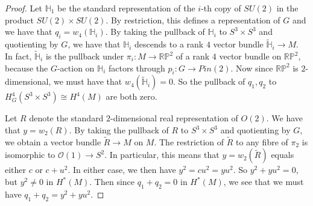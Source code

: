 \documentclass[10pt,a4paper]{amsart}
\begin{document}
\begin{proof}
Let $\mathbb{H}_1$ be the standard representation of the $i$-th copy of $SU(2)$ in the product $SU(2) \times SU(2)$. By restriction, this defines a representation of $G$ and we have that $q_i = w_4( \mathbb{H}_i)$. By taking the pullback of $\mathbb{H}_i$ to $S^3 \times S^3$ and quotienting by $G$, we have that $\mathbb{H}_i$ descends to a rank $4$ vector bundle $\widetilde{\mathbb{H}}_i \to M$. In fact, $\widetilde{\mathbb{H}}_i$ is the pullback under $\pi_i : M \to \mathbb{RP}^2$ of a rank $4$ vector bundle on $\mathbb{RP}^2$, because the $G$-action on $\mathbb{H}_i$ factors through $p_i : G \to Pin(2)$. Now since $\mathbb{RP}^2$ is $2$-dimensional, we must have that $w_4(\widetilde{\mathbb{H}}_i) = 0$. So the pullback of $q_1,q_2$ to $H^4_{G}(S^3 \times S^3) \cong H^4(M)$ are both zero.

Let $R$ denote the standard $2$-dimensional real representation of $O(2)$. We have that $y = w_2(R)$. By taking the pullback of $R$ to $S^3 \times S^3$ and quotienting by $G$, we obtain a vector bundle $\widetilde{R} \to M$ on $M$. The restriction of $\widetilde{R}$ to any fibre of $\pi_2$ is isomorphic to $\mathcal{O}(1) \to S^2$. In particular, this means that $y = w_2(\widetilde{R})$ equals either $c$ or $c+u^2$. In either case, we then have $y^2 = cu^2 = yu^2$. So $y^2 + yu^2 = 0$, but $y^2 \neq 0$ in $H^*(M)$. Then since $q_1 + q_2 = 0$ in $H^*(M)$, we see that we must have $q_1 + q_2 = y^2 + yu^2$.

\end{proof}
\end{document}
